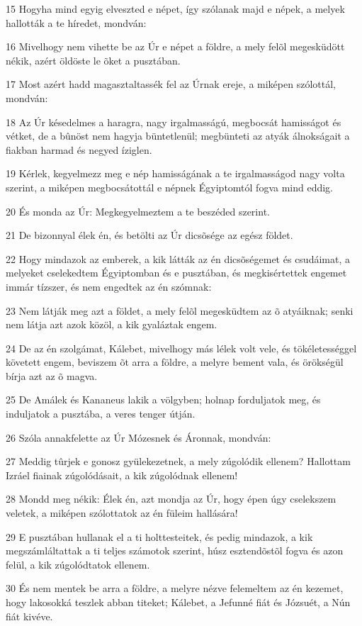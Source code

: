 \par 15 Hogyha mind egyig elveszted e népet, így szólanak majd e népek, a melyek hallották a te híredet, mondván:
\par 16 Mivelhogy nem vihette be az Úr e népet a földre, a mely felõl megesküdött nékik, azért öldöste le õket a pusztában.
\par 17 Most azért hadd magasztaltassék fel az Úrnak ereje, a miképen szólottál, mondván:
\par 18 Az Úr késedelmes a haragra, nagy irgalmasságú, megbocsát hamisságot és vétket, de a bûnöst nem hagyja büntetlenül;  megbünteti az atyák álnokságait a fiakban harmad és negyed íziglen.
\par 19 Kérlek, kegyelmezz meg e nép hamisságának a te irgalmasságod nagy volta szerint, a miképen megbocsátottál e népnek Égyiptomtól fogva mind eddig.
\par 20 És monda az Úr: Megkegyelmeztem a te beszéded szerint.
\par 21 De bizonnyal élek én, és betölti az Úr dicsõsége az egész földet.
\par 22 Hogy mindazok az emberek, a kik látták az én dicsõségemet és csudáimat, a melyeket cselekedtem Égyiptomban és e pusztában, és megkisértettek engemet immár tízszer, és nem engedtek az én szómnak:
\par 23 Nem látják meg azt a földet, a mely felõl megesküdtem az õ atyáiknak; senki nem látja azt azok közöl, a kik gyaláztak engem.
\par 24 De az én szolgámat, Kálebet, mivelhogy más lélek volt vele, és tökéletességgel követett engem, beviszem õt arra a földre, a melyre bement vala, és örökségül bírja azt az õ magva.
\par 25 De Amálek és Kananeus lakik a völgyben; holnap forduljatok meg, és induljatok a pusztába, a veres tenger útján.
\par 26 Szóla annakfelette az Úr Mózesnek és Áronnak, mondván:
\par 27 Meddig tûrjek e gonosz gyülekezetnek, a mely zúgolódik ellenem? Hallottam Izráel fiainak zúgolódásait, a kik zúgolódnak ellenem!
\par 28 Mondd meg nékik: Élek én, azt mondja az Úr, hogy épen úgy cselekszem veletek, a miképen szólottatok az én füleim hallására!
\par 29 E pusztában hullanak el a ti holttesteitek, és pedig mindazok, a kik megszámláltattak a ti teljes számotok szerint, húsz esztendõstõl fogva és azon felül, a kik zúgolódtatok ellenem.
\par 30 És nem mentek be arra a földre, a melyre nézve felemeltem az én kezemet, hogy lakosokká teszlek abban titeket; Kálebet, a Jefunné fiát és Józsuét, a Nún fiát kivéve.
